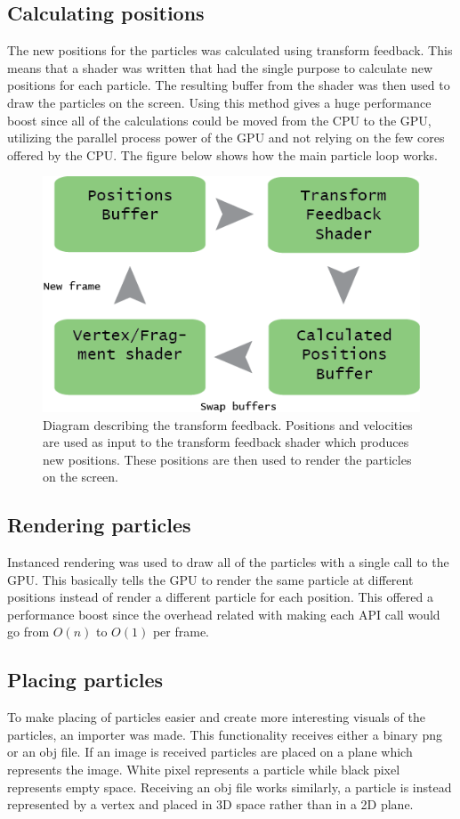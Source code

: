 \documentclass[report]{vgtc}
\begin{document}
\subsection{Calculating positions}
The new positions for the particles was calculated using transform feedback. This means that a shader was written that had the single purpose to calculate new positions for each particle. The resulting buffer from the shader was then used to draw the particles on the screen. Using this method gives a huge performance boost since all of the calculations could be moved from the CPU to the GPU, utilizing the parallel process power of the GPU and not relying on the few cores offered by the CPU.  The figure below shows how the main particle loop works.
\begin{figure}[H]
\includegraphics[scale=0.47]{img/transform.png}
\caption{Diagram describing the transform feedback. Positions and velocities are used as input to the transform feedback shader which produces new positions. These positions are then used to render the particles on the screen. }
\end{figure}

\subsection{Rendering particles}
Instanced rendering was used to draw all of the particles with a single call to the GPU. This basically tells the GPU to render the same particle at different positions instead of render a different particle for each position. This offered a performance boost since the overhead related with making each API call would go from \(O(n)\) to \(O(1)\) per frame. 


\subsection{Placing particles}
To make placing of particles easier and create more interesting visuals of the particles, an importer was made. This functionality receives either a binary png or an obj file. If an image is received particles are placed on a plane which represents the image. White pixel represents a particle while black pixel represents empty space. 
Receiving an obj file works similarly, a particle is instead represented by a vertex and placed in 3D space rather than in a 2D plane.
\end{document}

